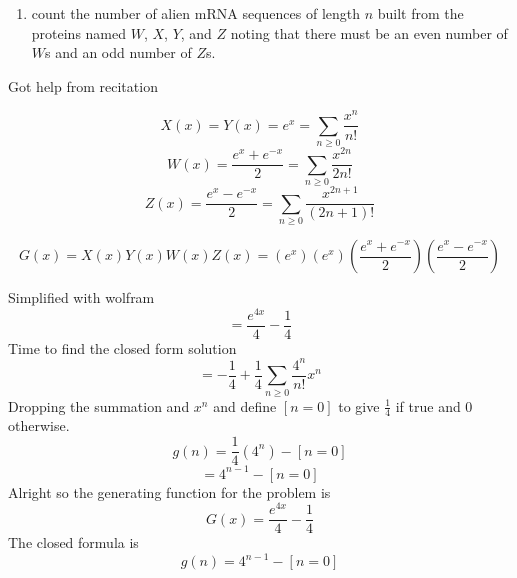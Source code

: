\documentclass[10pt, AMS Euler]{article}
\begin{document}
	\newpage
	\begin{enumerate}[resume]
		\item count the number of alien mRNA sequences of length $n$ built from the proteins named $W$, $X$, $Y$, and $Z$ noting that there must be an even number of $W$s and an odd number of $Z$s. 
	\end{enumerate}

        Got help from recitation
	
	$$ X(x) = Y(x) = e^x = \sum_{n\geq0} \frac{x^n}{n!} $$
        $$ W(x) = \frac{e^x + e^{-x}}{2} = \sum_{n\geq0} \frac{x^{2n}}{2n!} $$
        $$ Z(x) = \frac{e^x - e^{-x}}{2} = \sum_{n\geq0} \frac{x^{2n+1}}{(2n+1)!} $$

        $$ G(x) = X(x)Y(x)W(x)Z(x) = (e^x)(e^x)(\frac{e^x + e^{-x}}{2})(\frac{e^x - e^{-x}}{2}) $$
        
        Simplified with wolfram
        $$ = \frac{e^{4x}}{4} - \frac{1}{4} $$
        Time to find the closed form solution
        $$ = -\frac{1}{4} + \frac{1}{4} \sum_{n\geq0} \frac{4^n}{n!} x^n $$
        Dropping the summation and $x^n$ and define $[n=0]$ to give $\frac{1}{4}$ if true and 0 otherwise.
        $$ g(n) = \frac{1}{4} (4^n) - [n=0] $$
        $$ =  4^{n-1} - [n=0] $$
        Alright so the generating function for the problem is
        $$ G(x) = \frac{e^{4x}}{4} - \frac{1}{4} $$
        The closed formula is
        $$ g(n) =  4^{n-1} - [n=0] $$
	
	\noindent \underline{\hspace{3in}}\\
	
	
	
	
\end{document}
